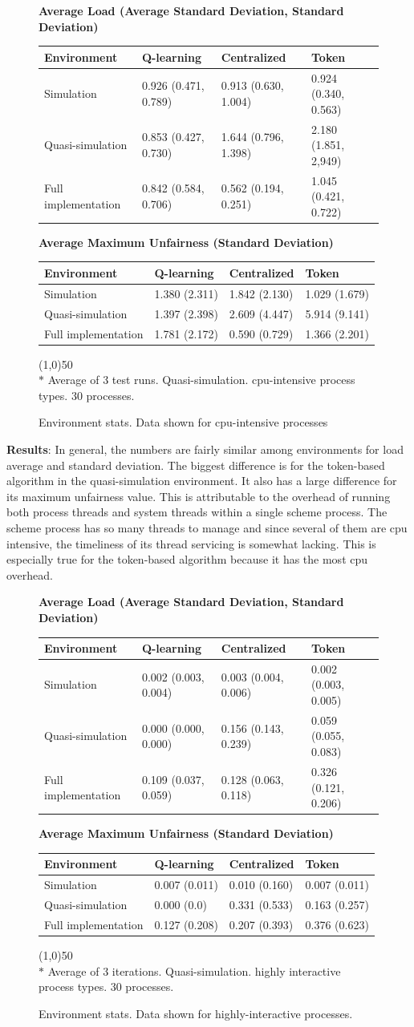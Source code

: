 \documentclass{report}
\newcommand{\envtbl}[6]{
\begin{figure}[H]

\begin{center}
\textbf{#1}
\end{center}

\begin{tabularx}{\linewidth}{|X|X|X|X|} \hline
	\textbf{Environment} & \textbf{Q-learning} & \textbf{Centralized} & \textbf{Token} \\ \hline
	#2
\end{tabularx}

\begin{center}
\textbf{#3}
\end{center}

\begin{tabularx}{\linewidth}{|X|X|X|X|} \hline
	\textbf{Environment} & \textbf{Q-learning} & \textbf{Centralized} & \textbf{Token} \\ \hline
	#4
\end{tabularx}

\vspace{1em}
\line(1,0){50} \\
#5

\caption{#6}
\end{figure}}
\begin{document}
\envtbl{Average Load (Average Standard Deviation, Standard Deviation)}
{	Simulation  & 0.926 (0.471, 0.789) & 0.913 (0.630, 1.004) & 0.924
(0.340, 0.563)  \\ \hline
	Quasi-simulation  & 0.853 (0.427, 0.730) & 1.644 (0.796, 1.398) &
2.180 (1.851, 2,949) \\ \hline
	Full implementation & 0.842 (0.584, 0.706) & 0.562 (0.194, 0.251) &
1.045 (0.421, 0.722) \\ \hline}
{Average Maximum Unfairness (Standard Deviation)}
{	Simulation  & 1.380 (2.311) & 1.842 (2.130) & 1.029 (1.679)  \\ \hline
	Quasi-simulation  & 1.397 (2.398) & 2.609 (4.447) & 5.914 (9.141) \\ \hline
	Full implementation & 1.781 (2.172) & 0.590 (0.729) & 1.366 (2.201) \\ \hline}
{$*$ Average of 3 test runs.  Quasi-simulation.  cpu-intensive process types.  30
processes.}
{Environment stats.  Data shown for cpu-intensive processes}

\textbf{Results}: In general, the numbers are fairly similar among
environments for load average and standard deviation.  The biggest
difference is for the token-based algorithm in the quasi-simulation
environment.  It also has a large difference for its maximum unfairness
value.  This is attributable to the overhead of running both process threads
and system threads within a single scheme process.  The scheme process has
so many threads to manage and since several of them are cpu intensive, the
timeliness of its thread servicing is somewhat lacking.  This is especially
true for the token-based algorithm because it has the most cpu overhead.


\envtbl{Average Load (Average Standard Deviation, Standard Deviation)}
{	Simulation  & 0.002 (0.003, 0.004) & 0.003 (0.004, 0.006) & 0.002
(0.003, 0.005)  \\ \hline
	Quasi-simulation  & 0.000 (0.000, 0.000) & 0.156 (0.143, 0.239) &
0.059 (0.055, 0.083) \\ \hline
	Full implementation & 0.109 (0.037, 0.059) & 0.128 (0.063, 0.118) &
0.326 (0.121, 0.206) \\ \hline}
{Average Maximum Unfairness (Standard Deviation)}
{	Simulation  & 0.007 (0.011) & 0.010 (0.160) & 0.007 (0.011)  \\ \hline
	Quasi-simulation  & 0.000 (0.0) & 0.331 (0.533) & 0.163 (0.257) \\ \hline
	Full implementation & 0.127 (0.208) & 0.207 (0.393) & 0.376 (0.623) \\ \hline}
{$*$ Average of 3 iterations.  Quasi-simulation.  highly interactive process
types.  30 processes.}
{Environment stats.  Data shown for highly-interactive processes.}
\end{document}
